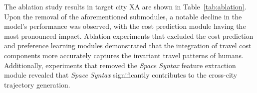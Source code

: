 The ablation study results in target city XA are shown in Table~\ref{tab:ablation}. 
Upon the removal of the aforementioned submodules, a notable decline in the model's performance was observed, with the cost prediction module having the most pronounced impact. Ablation experiments that excluded the cost prediction and preference learning modules demonstrated that the integration of travel cost components more accurately captures the invariant travel patterns of humans. Additionally, experiments that removed the \textit{Space Syntax} feature extraction module revealed that \textit{Space Syntax} significantly contributes to the cross-city trajectory generation.


